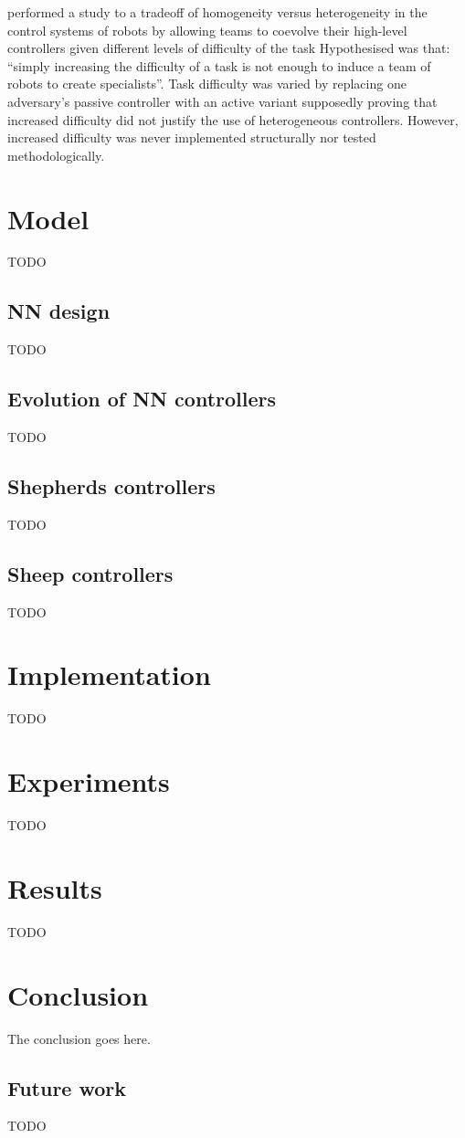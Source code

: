 \documentclass[conference]{IEEEtran}
\begin{document}
\cite{potter2001heterogeneity} performed a study to a tradeoff of homogeneity versus heterogeneity in the control systems of robots by allowing teams to coevolve their high-level controllers given different levels of difficulty of the task
Hypothesised was that: “simply increasing the difficulty of a task is not enough to induce a team of robots to create specialists”. 
Task difficulty was varied by replacing one adversary's passive controller with an active variant supposedly proving that increased difficulty did not justify the use of heterogeneous controllers.
However, increased difficulty was never implemented structurally nor tested methodologically. 



\section{Model}
TODO

\subsection{NN design}
TODO

\subsection{Evolution of NN controllers}
TODO

\subsection{Shepherds controllers}
TODO

\subsection{Sheep controllers}
TODO

\section{Implementation}
TODO

\section{Experiments}
TODO

\section{Results}
TODO

\section{Conclusion}
The conclusion goes here.

\subsection{Future work}
TODO





\end{document}

